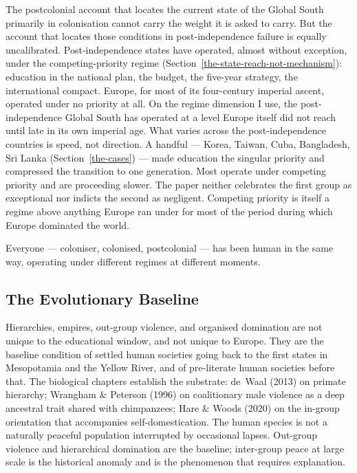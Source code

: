 \documentclass[12pt,letterpaper]{article}
\begin{document}
The postcolonial account that locates the current state of the Global
South primarily in colonisation cannot carry the weight it is asked to
carry. But the account that locates those conditions in
post-independence failure is equally uncalibrated. Post-independence
states have operated, almost without exception, under the
competing-priority regime
(Section~\ref{the-state-reach-not-mechanism}): education in the
national plan, the budget, the five-year strategy, the international
compact. Europe, for most of its four-century imperial ascent,
operated under no priority at all. On the regime dimension I
use, the post-independence Global South has operated at a level
Europe itself did not reach until late in its own imperial age. What
varies across the post-independence countries is speed, not direction.
A handful --- Korea, Taiwan, Cuba, Bangladesh, Sri Lanka
(Section~\ref{the-cases}) --- made education the singular priority and
compressed the transition to one generation. Most operate under
competing priority and are proceeding slower. The paper neither
celebrates the first group as exceptional nor indicts the second as
negligent. Competing priority is itself a regime above anything Europe
ran under for most of the period during which Europe dominated the
world.

Everyone --- coloniser, colonised, postcolonial --- has been human in
the same way, operating under different regimes at different moments.

\subsection{The Evolutionary Baseline}\label{the-evolutionary-baseline}

Hierarchies, empires, out-group violence, and organised domination are
not unique to the educational window, and not unique to Europe. They
are the baseline condition of settled human societies going back to
the first states in Mesopotamia and the Yellow River, and of
pre-literate human societies before that. The biological chapters
establish the substrate: de~Waal (2013) on primate hierarchy; Wrangham
\& Peterson (1996) on coalitionary male violence as a deep ancestral
trait shared with chimpanzees; Hare \& Woods (2020) on the in-group
orientation that accompanies self-domestication. The human species is not a naturally peaceful
population interrupted by occasional lapses. Out-group violence and
hierarchical domination are the baseline; inter-group peace at large
scale is the historical anomaly and is the phenomenon that requires
explanation.
\end{document}
